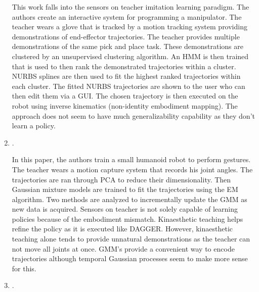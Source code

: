 \begin{enumerate}
    This work falls into the sensors on teacher imitation learning paradigm. The
    authors create an interactive system for programming a manipulator. The
    teacher wears a glove that is tracked by a motion tracking system providing
    demonstrations of end-effector trajectories. The teacher provides multiple
    demonstrations of the same pick and place task.  These demonstrations are
    clustered by an unsupervised clustering algorithm.  An HMM is then trained
    that is used to then rank the demonstrated trajectories within a cluster.
    NURBS splines are then used to fit the highest ranked trajectories within
    each cluster. The fitted NURBS trajectories are shown to the user who can
    then edit them via a GUI. The chosen trajectory is then executed on the
    robot using inverse kinematics (non-identity embodiment mapping). The
    approach does not seem to have much generalizability capability as they don't
    learn a policy.

    \item {}. 
    

    In this paper, the authors train a small humanoid robot to perform gestures.
    The teacher wears a motion capture system that records his joint angles.
    The trajectories are ran through PCA to reduce their dimensionality. Then
    Gaussian mixture models are trained to fit the trajectories using the EM
    algorithm. Two methods are analyzed to incrementally update the GMM as new
    data is acquired. Sensors on teacher is not solely capable of learning
    policies because of the embodiment mismatch. Kinaesthetic teaching helps
    refine the policy as it is executed like DAGGER. However, kinaesthetic
    teaching alone tends to provide unnatural demonstrations as the teacher can
    not move all joints at once. GMM's provide a convenient way to encode
    trajectories although temporal Gaussian processes seem to make more sense
    for this.

    \item {}. 
    


\end{enumerate}
